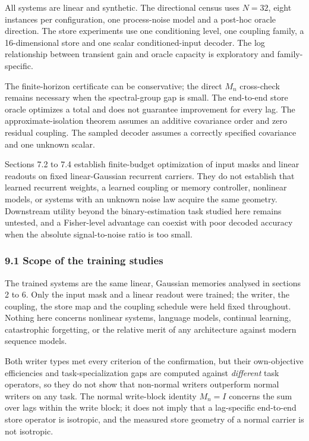 \documentclass[
  10pt,
]{article}
\begin{document}
All systems are linear and synthetic. The directional census uses
\(N=32\), eight instances per configuration, one process-noise model and
a post-hoc oracle direction. The store experiments use one conditioning
level, one coupling family, a 16-dimensional store and one scalar
conditioned-input decoder. The log relationship between transient gain
and oracle capacity is exploratory and family-specific.

The finite-horizon certificate can be conservative; the direct \(M_n\)
cross-check remains necessary when the spectral-group gap is small. The
end-to-end store oracle optimizes a total and does not guarantee
improvement for every lag. The approximate-isolation theorem assumes an
additive covariance order and zero residual coupling. The sampled
decoder assumes a correctly specified covariance and one unknown scalar.

Sections 7.2 to 7.4 establish finite-budget optimization of input masks
and linear readouts on fixed linear-Gaussian recurrent carriers. They do
not establish that learned recurrent weights, a learned coupling or
memory controller, nonlinear models, or systems with an unknown noise
law acquire the same geometry. Downstream utility beyond the
binary-estimation task studied here remains untested, and a Fisher-level
advantage can coexist with poor decoded accuracy when the absolute
signal-to-noise ratio is too small.

\subsubsection{9.1 Scope of the training
studies}\label{scope-of-the-training-studies}

The trained systems are the same linear, Gaussian memories analysed in
sections 2 to 6. Only the input mask and a linear readout were trained;
the writer, the coupling, the store map and the coupling schedule were
held fixed throughout. Nothing here concerns nonlinear systems, language
models, continual learning, catastrophic forgetting, or the relative
merit of any architecture against modern sequence models.

Both writer types met every criterion of the confirmation, but their
own-objective efficiencies and task-specialization gaps are computed
against \emph{different} task operators, so they do not show that
non-normal writers outperform normal writers on any task. The normal
write-block identity \(M_n=I\) concerns the sum over lags within the
write block; it does not imply that a lag-specific end-to-end store
operator is isotropic, and the measured store geometry of a normal
carrier is not isotropic.
\end{document}

